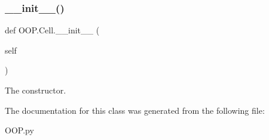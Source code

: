 \subsubsection{\texorpdfstring{\+\_\+\+\_\+init\+\_\+\+\_\+()}{\_\_init\_\_()}}
{\footnotesize\ttfamily def O\+O\+P.\+Cell.\+\_\+\+\_\+init\+\_\+\+\_\+ (\begin{DoxyParamCaption}\item[{}]{self }\end{DoxyParamCaption})}



The constructor. 



The documentation for this class was generated from the following file\+:\begin{DoxyCompactItemize}
\item 
O\+O\+P.\+py\end{DoxyCompactItemize}
